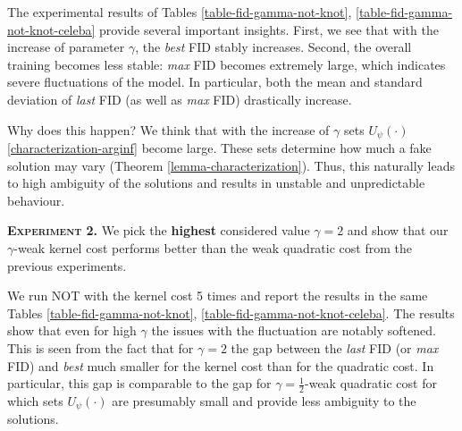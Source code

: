 \documentclass{article} %
\begin{document}
\vspace{-1mm}The experimental results of Tables \ref{table-fid-gamma-not-knot}, \ref{table-fid-gamma-not-knot-celeba} provide several important insights. First, we see that with the increase of parameter $\gamma$, the \textit{best} FID stably increases. Second, the overall training becomes less stable: \textit{max} FID becomes extremely large, which indicates severe fluctuations of the model. In particular, both the mean and standard deviation of \textit{last} FID (as well as \textit{max} FID) drastically increase. 

\vspace{-1mm}Why does this happen? We think that with the increase of $\gamma$ sets $U_{\psi}(\cdot)$ \eqref{characterization-arginf} become large. These sets determine how much a fake solution may vary (Theorem \ref{lemma-characterization}). Thus, this naturally leads to high ambiguity of the solutions and results in unstable and unpredictable behaviour.

\vspace{-1mm}\textsc{\textbf{Experiment 2.}} We pick the \textbf{highest} considered value $\gamma=2$ and show that our $\gamma$-weak kernel cost performs better than the weak quadratic cost from the previous experiments.

\vspace{-1mm}We run NOT with the kernel cost 5 times and report the results in the same Tables \ref{table-fid-gamma-not-knot}, \ref{table-fid-gamma-not-knot-celeba}. The results show that even for high $\gamma$ the issues with the fluctuation are notably softened. This is seen from the fact that for $\gamma=2$ the gap between the \textit{last} FID (or \textit{max} FID) and \textit{best} much smaller for the kernel cost than for the quadratic cost. In particular, this gap is comparable to the gap for $\gamma=\frac{1}{2}$-weak quadratic cost for which sets $U_{\psi}(\cdot)$ are presumably small and provide less ambiguity to the solutions.
\end{document}
